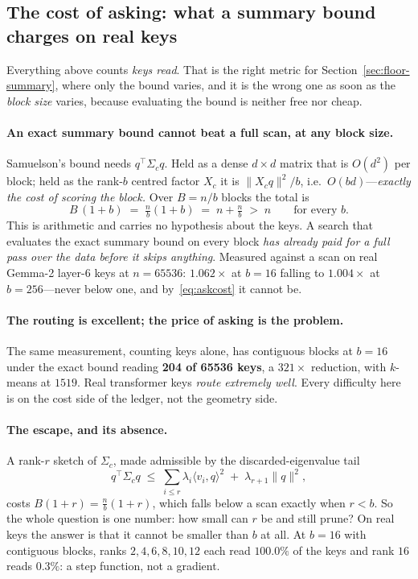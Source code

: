 \documentclass[11pt]{article}
\numberwithin{equation}{section}
\begin{document}
\subsection{The cost of asking: what a summary bound charges on real keys}\label{sec:askcost}

Everything above counts \emph{keys read}. That is the right metric for Section~\ref{sec:floor-summary}, where
only the bound varies, and it is the wrong one as soon as the \emph{block size} varies, because
evaluating the bound is neither free nor cheap.

\paragraph{An exact summary bound cannot beat a full scan, at any block size.} Samuelson's bound needs
$q^\top\Sigma_c q$. Held as a dense $d\times d$ matrix that is $O(d^2)$ per block; held as the rank-$b$
centred factor $X_c$ it is $\lVert X_c q\rVert^2/b$, i.e.\ $O(bd)$---\emph{exactly the cost of scoring
the block.} Over $B=n/b$ blocks the total is
\begin{equation}\label{eq:askcost}
B\,(1+b)\;=\;\tfrac{n}{b}(1+b)\;=\;n+\tfrac{n}{b}\;>\;n\qquad\text{for every }b .
\end{equation}
This is arithmetic and carries no hypothesis about the keys. A search that evaluates the exact summary
bound on every block \emph{has already paid for a full pass over the data before it skips anything}.
Measured against a scan on real Gemma-2 layer-6 keys at $n=65536$: $1.062\times$ at $b=16$ falling to
$1.004\times$ at $b=256$---never below one, and by~\eqref{eq:askcost} it cannot be.

\paragraph{The routing is excellent; the price of asking is the problem.} The same measurement, counting
keys alone, has contiguous blocks at $b=16$ under the exact bound reading \textbf{204 of 65536 keys}, a
$321\times$ reduction, with $k$-means at $1519$. Real transformer keys \emph{route extremely well}. Every
difficulty here is on the cost side of the ledger, not the geometry side.

\paragraph{The escape, and its absence.} A rank-$r$ sketch of $\Sigma_c$, made admissible by the
discarded-eigenvalue tail
\[
q^\top\Sigma_c q \;\le\; \sum_{i\le r}\lambda_i\langle v_i,q\rangle^2 \;+\; \lambda_{r+1}\lVert q\rVert^2 ,
\]
costs $B(1+r)=\frac{n}{b}(1+r)$, which falls below a scan exactly when $r<b$. So the whole question is
one number: how small can $r$ be and still prune? On real keys the answer is that it cannot be smaller
than $b$ at all. At $b=16$ with contiguous blocks, ranks $2,4,6,8,10,12$ each read $100.0\%$ of the keys
and rank $16$ reads $0.3\%$: a step function, not a gradient.
\end{document}
